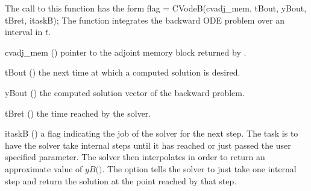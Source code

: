 The call to this function has the form
{
  flag = CVodeB(cvadj\_mem, tBout, yBout, tBret, itaskB);
}
{
  The function  integrates the backward ODE problem over an 
  interval in $t$.
}
{
  \begin{args}
  \item[cvadj\_mem] ()
    pointer to the adjoint memory block returned by .
  \item[tBout] ()
    the next time at which a computed solution is desired.
  \item[yBout] ()
    the computed solution vector of the backward problem.
  \item[tBret] ()
    the time reached by the solver.
  \item[itaskB] ()
    a flag indicating the job of the solver for the next step. 
    The  task is to have the solver take internal steps until   
    it has reached or just passed the user specified 
    parameter. The solver then interpolates in order to   
    return an approximate value of $yB($$)$. 
    The  option tells the solver to just take one internal step  
    and return the solution at the point reached by that step. 
  \end{args}
}
